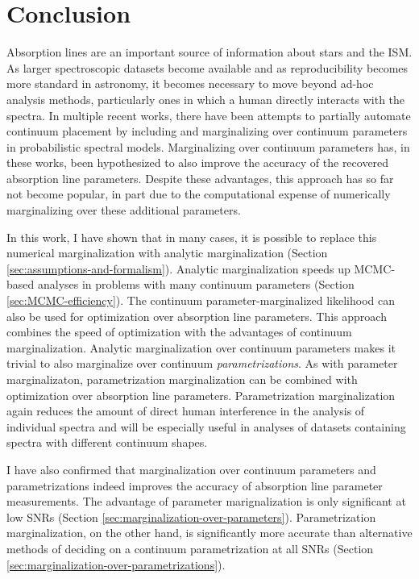 \documentclass[manuscript]{aastex62}
\begin{document}
\section{Conclusion}
\label{sec:conclusion}
Absorption lines are an important source of information about stars and the ISM.
As larger spectroscopic datasets become available and as reproducibility becomes more standard in astronomy, it becomes necessary to move beyond ad-hoc analysis methods, particularly ones in which a human directly interacts with the spectra.
In multiple recent works, there have been attempts to partially automate continuum placement by including and marginalizing over continuum parameters in probabilistic spectral models.
Marginalizing over continuum parameters has, in these works, been hypothesized to also improve the accuracy of the recovered absorption line parameters.
Despite these advantages, this approach has so far not become popular, in part due to the computational expense of numerically marginalizing over these additional parameters.

In this work, I have shown that in many cases, it is possible to replace this numerical marginalization with analytic marginalization (Section \ref{sec:assumptions-and-formalism}).
Analytic marginalization speeds up MCMC-based analyses in problems with many continuum parameters (Section \ref{sec:MCMC-efficiency}).
The continuum parameter-marginalized likelihood can also be used for optimization over absorption line parameters.
This approach combines the speed of optimization with the advantages of continuum marginalization.
Analytic marginalization over continuum parameters makes it trivial to also marginalize over continuum \emph{parametrizations}.
As with parameter marginalizaton, parametrization marginalization can be combined with optimization over absorption line parameters.
Parametrization marginalization again reduces the amount of direct human interference in the analysis of individual spectra and will be especially useful in analyses of datasets containing spectra with different continuum shapes.

I have also confirmed that marginalization over continuum parameters and parametrizations indeed improves the accuracy of absorption line parameter measurements.
The advantage of parameter marignalization is only significant at low SNRs (Section \ref{sec:marginalization-over-parameters}).
Parametrization marginalization, on the other hand, is significantly more accurate than alternative methods of deciding on a continuum parametrization at all SNRs (Section \ref{sec:marginalization-over-parametrizations}).
\end{document}
